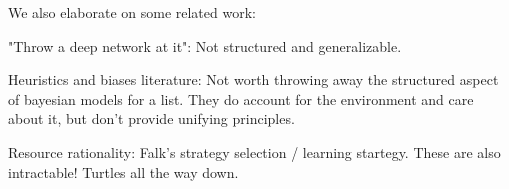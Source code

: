 We also elaborate on some related work:

"Throw a deep network at it": Not structured and generalizable.

Heuristics and biases literature: Not worth throwing away the structured aspect of bayesian models for a list. They do account for the environment and care about it, but don't provide unifying principles.

Resource rationality: Falk's strategy selection / learning startegy. These are also intractable! Turtles all the way down.





